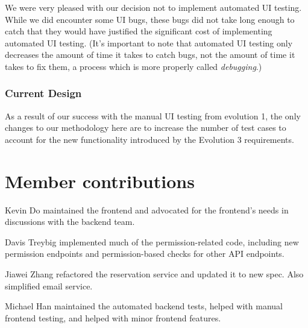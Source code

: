 \documentclass[12pt]{article}
\begin{document}
We were very pleased with our decision not to implement automated UI testing. While we did encounter some UI bugs, these bugs did not take long enough to catch that they would have justified the significant cost of implementing automated UI testing. (It's important to note that automated UI testing only decreases the amount of time it takes to catch bugs, not the amount of time it takes to fix them, a process which is more properly called \emph{debugging}.)

\subsubsection{Current Design}
As a result of our success with the manual UI testing from evolution 1, the only changes to our methodology here are to increase the number of test cases to account for the new functionality introduced by the Evolution 3 requirements.

\section{Member contributions}

Kevin Do maintained the frontend and advocated for the frontend's needs in discussions with the backend team.

Davis Treybig implemented much of the permission-related code, including new permission endpoints and permission-based checks for other API endpoints. 

Jiawei Zhang refactored the reservation service and updated it to new spec. Also simplified email service.

Michael Han maintained the automated backend tests, helped with manual frontend testing, and helped with minor frontend features.

\clearpage
\appendix
\end{document}
